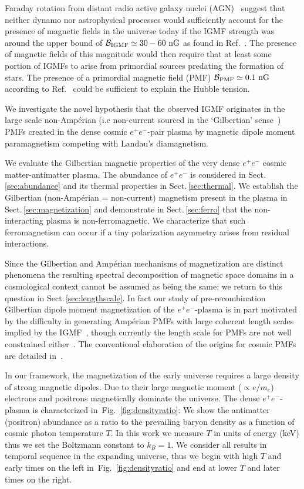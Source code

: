 \documentclass[aps,prd,floatfix,reprint]{revtex4-2}
\newcommand{\rf}[1]{Fig.~{\ref{#1}}}
\newcommand{\rsec}[1]{Sect.\,{\ref{#1}}}
\newcommand*{\xblue}{\color{blue}}
\begin{document}
Faraday rotation from distant radio active galaxy nuclei (AGN)~\cite{Pomakov:2022cem} suggest that neither dynamo nor astrophysical processes would sufficiently account for the presence of magnetic fields in the universe today if the IGMF strength was around the upper bound of ${\cal B}_{\rm IGMF}\simeq30-60{\rm\ nG}$ as found in Ref.~\cite{Vernstrom:2021hru}. The presence of magnetic fields of this magnitude would then require that at least some portion of IGMFs to arise from primordial sources predating the formation of stars. The presence of a primordial magnetic field (PMF) ${\cal B}_{\rm PMF}\simeq0.1{\rm\ nG}$ according to Ref.~\cite{Jedamzik:2020krr} could be sufficient to explain the Hubble tension.

We investigate the novel hypothesis that the observed IGMF originates in the large scale non-Amp\'erian (i.e non-current sourced in the `Gilbertian' sense~\cite{Rafelski:2017hce}) PMFs created in the dense cosmic $e^{+}e^{-}$-pair plasma by magnetic dipole moment paramagnetism competing with Landau's diamagnetism.

{\xblue We evaluate the Gilbertian magnetic properties of the very dense $e^{+}e^{-}$ cosmic matter-antimatter plasma. The abundance of $e^{+}e^{-}$ is considered in \rsec{sec:abundance} and its thermal properties in \rsec{sec:thermal}. We establish the Gilbertian (non-Amp\'erian = non-current) magnetism present in the plasma in \rsec{sec:magnetization} and demonstrate in \rsec{sec:ferro} that the non-interacting plasma is non-ferromagnetic. We characterize that such ferromagnetism can occur if a tiny polarization asymmetry arises from residual interactions.}

{\xblue Since the Gilbertian and Amp\'erian mechanisms of magnetization are distinct phenomena the resulting spectral decomposition of magnetic space domains in a cosmological context cannot be assumed as being the same; we return to this question in \rsec{sec:lengthscale}.} In fact our study of pre-recombination Gilbertian dipole moment magnetization of the $e^{+}e^{-}$-plasma is in part motivated by the difficulty in generating Amp\'erian PMFs with large coherent length scales implied by the IGMF~\cite{Giovannini:2022rrl}, though currently the length scale for PMFs are not well constrained either~\cite{AlvesBatista:2021sln}.  The conventional elaboration of the origins for cosmic PMFs are detailed in~\cite{Gaensler:2004gk,Durrer:2013pga,AlvesBatista:2021sln}.

In our framework, the magnetization of the early universe requires a large density of strong magnetic dipoles. Due to their large magnetic moment ($\propto e/m_e$) electrons and positrons magnetically dominate the universe. The dense $e^{+}e^{-}$-plasma is characterized in~\rf{fig:densityratio}: We show the antimatter (positron) abundance as a ratio to the prevailing baryon density as a function of cosmic photon temperature $T$. In this work we measure $T$ in units of energy (keV) thus we set the Boltzmann constant to $k_{B}=1$. We consider all results in temporal sequence in the expanding universe, thus we begin with high $T$ and early times on the left in~\rf{fig:densityratio} and end at lower $T$ and later times on the right.
\end{document}
